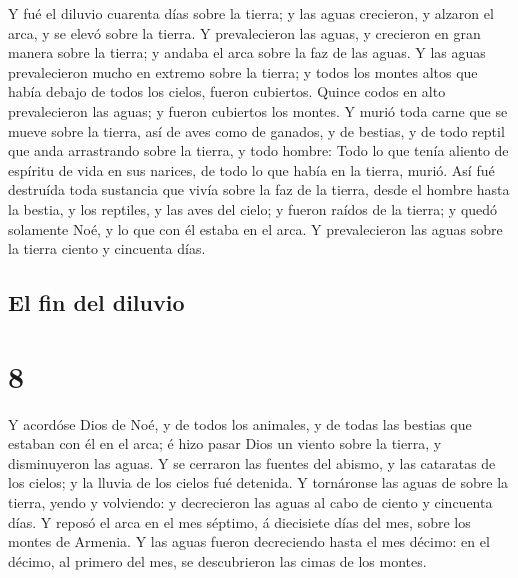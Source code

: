  Y fué el diluvio cuarenta días sobre la tierra; y las
aguas crecieron, y alzaron el arca, y se elevó sobre la tierra.
 Y prevalecieron las aguas, y crecieron en gran manera
sobre la tierra; y andaba el arca sobre la faz de las aguas.
 Y las aguas prevalecieron mucho en extremo sobre la
tierra; y todos los montes altos que había debajo de todos los cielos,
fueron cubiertos.  Quince codos en alto prevalecieron las
aguas; y fueron cubiertos los montes.  Y murió toda carne
que se mueve sobre la tierra, así de aves como de ganados, y de bestias,
y de todo reptil que anda arrastrando sobre la tierra, y todo hombre:
 Todo lo que tenía aliento de espíritu de vida en sus
narices, de todo lo que había en la tierra, murió.  Así
fué destruída toda sustancia que vivía sobre la faz de la tierra, desde
el hombre hasta la bestia, y los reptiles, y las aves del cielo; y
fueron raídos de la tierra; y quedó solamente Noé, y lo que con él
estaba en el arca.  Y prevalecieron las aguas sobre la
tierra ciento y cincuenta días.

\hypertarget{el-fin-del-diluvio}{%
\subsection{El fin del diluvio}\label{el-fin-del-diluvio}}

\hypertarget{section-01-8}{%
\section{8}\label{section-01-8}}

 Y acordóse Dios de Noé, y de todos los animales, y de
todas las bestias que estaban con él en el arca; é hizo pasar Dios un
viento sobre la tierra, y disminuyeron las aguas.  Y se
cerraron las fuentes del abismo, y las cataratas de los cielos; y la
lluvia de los cielos fué detenida.  Y tornáronse las aguas
de sobre la tierra, yendo y volviendo: y decrecieron las aguas al cabo
de ciento y cincuenta días.  Y reposó el arca en el mes
séptimo, á diecisiete días del mes, sobre los montes de Armenia.
 Y las aguas fueron decreciendo hasta el mes décimo: en el
décimo, al primero del mes, se descubrieron las cimas de los montes.

